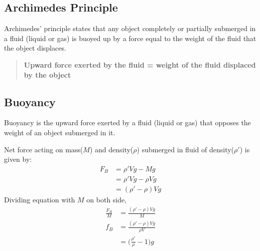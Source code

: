 \documentclass[fleqn,10pt]{SelfArx} %
\begin{document}
\subsection{Archimedes Principle}
Archimedes' principle states that any object completely or partially submerged in a fluid (liquid or gas) is buoyed up by a force equal to the weight of the fluid that the object displaces.

\begin{quote}
\raggedright
\textbf{Upward force exerted by the fluid = weight of the fluid displaced by the object}
\end{quote}

\subsection{Buoyancy}
Buoyancy is the upward force exerted by a fluid (liquid or gas) that opposes the weight of an object submerged in it.

\begin{center}
\end{center}

Net force acting on mass($M$) and density($\rho$) submerged in fluid of density($\rho'$) is given by:
\begin{align}
    F_B &= \rho' Vg - Mg  \label{eq:buoyancy_force} \\
        &= \rho' Vg - \rho Vg \\
        &= (\rho' - \rho) Vg
\end{align}
Dividing equation with $M$ on both side,
\begin{align}
    \frac{F_B}{M} &= \frac{(\rho' - \rho) Vg}{M} \\
    f_B              &= \frac{(\rho' - \rho) Vg}{\rho V} \\
                     &= \Big(\frac{\rho'}{\rho}-1\Big)g  \label{eq:acceration_due_to_buoyancy}
\end{align}
\end{document}
